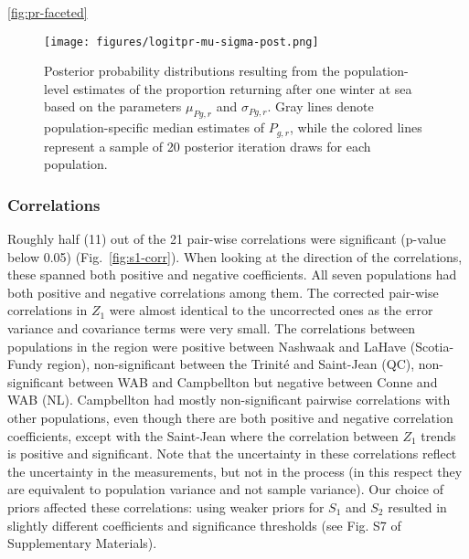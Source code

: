 \documentclass[12pt]{article}
\newcommand{\So}{$S_{1}$\xspace}
\newcommand{\St}{$S_{2}$\xspace}
\newcommand{\prmu}{$\mu_{Pg,r}$\xspace}
\newcommand{\prsig}{$\sigma_{Pg,r}$\xspace}
\begin{document}
\ref{fig:pr-faceted}


% 

% 



\begin{figure}[htbp] \centering
    \texttt{[image: figures/logitpr-mu-sigma-post.png]}
    \caption{Posterior probability distributions resulting from the population-level estimates of the proportion returning after one winter at sea based on
        the parameters \prmu and \prsig. Gray lines denote population-specific median estimates of $P_{g,r}$, while
       the colored lines represent a sample of 20 posterior iteration draws for each population.}
   \label{fig:prmu-post}
\end{figure}


\subsubsection*{Correlations}

Roughly half (11) out of the 21 pair-wise correlations were significant (p-value below 0.05)
(Fig.~\ref{fig:s1-corr}). When looking at the direction of the correlations,
these spanned both positive and negative coefficients. All seven populations had both
positive and negative correlations among them.
The corrected pair-wise correlations in $Z_1$ were almost identical to the
uncorrected ones as the error variance and covariance terms were very small.
The correlations between populations in the region were positive between Nashwaak and LaHave (Scotia-Fundy region), non-significant between the Trinit\'{e} and Saint-Jean (QC),
non-significant between WAB and Campbellton but negative between Conne and WAB (NL).
Campbellton had mostly non-significant pairwise correlations with other populations, even though there are both positive and negative correlation coefficients, except with the Saint-Jean
where the correlation between $Z_1$ trends is positive and significant.
Note that the uncertainty in these correlations reflect the uncertainty in the
measurements, but not in the process (in this respect they are equivalent to
population variance and not sample variance).
Our choice of priors affected these correlations:
using weaker priors for \So and \St resulted in slightly different coefficients and significance thresholds (see Fig. S7 of Supplementary Materials). 
\end{document}
